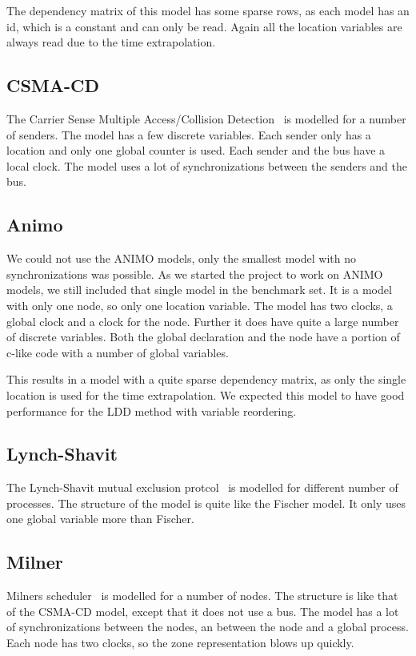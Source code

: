 The dependency matrix of this model has some sparse rows, as each model has an id, which is a constant and can only be read. Again all the location variables are always read due to the time extrapolation. 

\subsection{CSMA-CD}
The Carrier Sense Multiple Access/Collision Detection~\cite{kronos} is modelled for a number of senders. The model has a few discrete variables. Each sender only has a location and only one global counter is used. Each sender and the bus have a local clock. The model uses a lot of synchronizations between the senders and the bus.

\subsection{Animo}
We could not use the ANIMO models, only the smallest model with no synchronizations was possible. As we started the project to work on ANIMO models, we still included that single model in the benchmark set. It is a model with only one node, so only one location variable. The model has two clocks, a global clock and a clock for the node.  Further it does have quite a large number of discrete variables. Both the global declaration and the node have a portion of c-like code with a number of global variables. 

This results in a model with a quite sparse dependency matrix, as only the single location is used for the time extrapolation. We expected this model to have good performance for the LDD method with variable reordering.

\subsection{Lynch-Shavit}
The Lynch-Shavit mutual exclusion protcol~\cite{LS} is modelled for different number of processes. The structure of the model is quite like the Fischer model. It only uses one global variable more than Fischer.

\subsection{Milner}
Milners scheduler~\cite{Milner:1989:CC:534666} is modelled for a number of nodes. The structure is like that of the CSMA-CD model, except that it does not use a bus. The model has a lot of synchronizations between the nodes, an between the node and a global process. Each node has two clocks, so the zone representation blows up quickly. 

